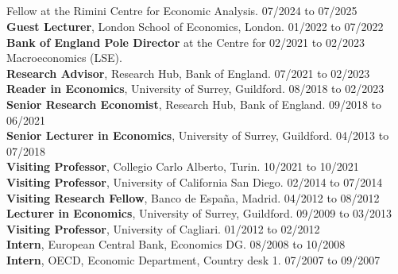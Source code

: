 \documentclass[margin, 11pt]{res} %
\begin{document}
\begin{resume}
\section{}
Fellow at the Rimini Centre for Economic Analysis. \hfill 07/2024 to 07/2025\\
\textbf{Guest Lecturer}, London School of Economics, London. \hfill 01/2022 to 07/2022\\
\textbf{Bank of England Pole Director} at the Centre for \hfill  02/2021 to 02/2023\\
 Macroeconomics (LSE). \\ 
\textbf{Research Advisor}, Research Hub, Bank of England. \hfill  07/2021 to 02/2023\\
\textbf{Reader in Economics}, University of Surrey, Guildford. \hfill 08/2018 to 02/2023\\
\textbf{Senior Research Economist}, Research Hub, Bank of England. \hfill  09/2018 to 06/2021\\
\textbf{Senior Lecturer in Economics}, University of Surrey, Guildford. \hfill 04/2013 to 07/2018\\
\textbf{Visiting Professor}, Collegio Carlo Alberto, Turin. \hfill 10/2021 to 10/2021\\
\textbf{Visiting Professor}, University of California San Diego. \hfill 02/2014 to 07/2014\\
\textbf{Visiting Research Fellow}, Banco de Espa\~{n}a, Madrid. \hfill 04/2012 to 08/2012\\
\textbf{Lecturer in Economics}, University of Surrey, Guildford. \hfill 09/2009 to 03/2013\\
\textbf{Visiting Professor}, University of Cagliari. \hfill 01/2012 to 02/2012\\
\textbf{Intern}, European Central Bank, Economics DG. \hfill 08/2008 to 10/2008\\
\textbf{Intern}, OECD, Economic Department, Country desk 1. \hfill 07/2007 to 09/2007







\end{resume}
\end{document}
